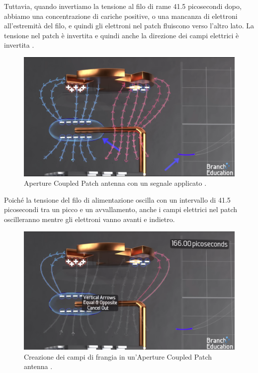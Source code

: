 Tuttavia, quando invertiamo la tensione al filo di rame 41.5 picosecondi dopo, abbiamo una concentrazione di cariche positive, o una mancanza di elettroni all'estremità del filo, e quindi gli elettroni nel patch fluiscono verso l'altro lato. La tensione nel patch è invertita e quindi anche la direzione dei campi elettrici è invertita \cite{branch_education_how_2022}.

\begin{figure}[htbp]
  \centering
  \includegraphics[width=0.8\linewidth]{./res/img/antenna_voltage_applied.png}
  \caption{Aperture Coupled Patch antenna con un segnale applicato \cite{branch_education_how_2022}.}
  \label{fig:aperture-couple-patch-antenna-voltage-applied}
\end{figure}

Poiché la tensione del filo di alimentazione oscilla con un intervallo di 41.5 picosecondi tra un picco e un avvallamento, anche i campi elettrici nel patch oscilleranno mentre gli elettroni vanno avanti e indietro.

\begin{figure}[htbp]
  \centering
  \includegraphics[width=0.8\linewidth]{./res/img/antenna_fringing_fields.png}
  \caption{Creazione dei campi di frangia in un'Aperture Coupled Patch antenna \cite{branch_education_how_2022}.}
  \label{fig:aperture-couple-patch-antenna-fringing-fields}
\end{figure}

